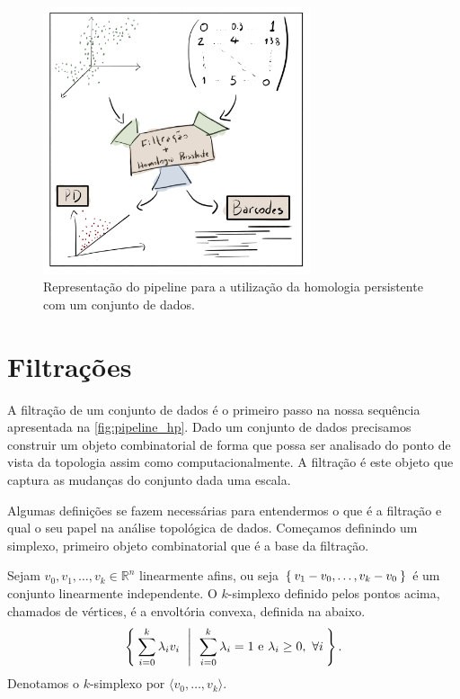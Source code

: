 \begin{figure}
  \centering
  \includegraphics[width=0.7\textwidth]{images/pipeline_hp.png}
  \caption{Representação do pipeline para a utilização da homologia persistente
          com um conjunto de dados.}
  \label{fig:pipeline_hp}
  \fautor
\end{figure}


\section{Filtrações}
A filtração de um conjunto de dados é o primeiro passo na nossa sequência apresentada
na \autoref{fig:pipeline_hp}.
Dado um conjunto de dados precisamos construir um objeto combinatorial de forma
que possa ser analisado do ponto de vista da topologia assim como computacionalmente.
A filtração é este objeto que captura as mudanças do conjunto dada uma escala.

Algumas definições se fazem necessárias para entendermos o que é a filtração
e qual o seu papel na análise topológica de dados. Começamos definindo um simplexo,
primeiro objeto combinatorial que é a base da filtração.

\begin{defi}
  Sejam $v_0, v_1, \dots, v_k \in \mathbb{R}^n$ linearmente afins, ou seja $\Set{v_1 - v_0, \dots, v_k - v_0}$
  é um conjunto linearmente independente. O $k$-simplexo definido pelos pontos acima,
  chamados de vértices, é a envoltória convexa, definida na abaixo.
  \begin{equation}
    \label{eq:envconv}
    \Set{\sum_{i=0}^k \lambda_i v_i \ | \ \sum_{i=0}^k \lambda_i = 1 \text{ e }
          \lambda_i \ge 0, \ \forall i}.
  \end{equation}
  Denotamos o $k$-simplexo por $\langle v_0, \dots, v_k \rangle$.
\end{defi}

